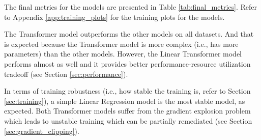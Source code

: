 \documentclass[a4paper, twoside]{report}
\theoremstyle{definition}
\numberwithin{equation}{section}
\begin{document}


The final metrics for the models are presented in Table \ref{tab:final_metrics}.
Refer to Appendix \ref{app:training_plots} for the training plots for the models.

The Transformer model outperforms the other models on all datasets. And that
is expected because the Transformer model is more complex (i.e., has more parameters)
than the other models. However, the Linear Transformer model performs almost as well
and it provides better performance-resource utilization tradeoff (see Section \ref{sec:performance}).

In terms of training robustness (i.e., how stable the training is, refer to Section \ref{sec:training}),
a simple Linear Regression model is the most stable model, as expected. Both Transformer models suffer
from the gradient explosion problem which leads to unstable training
which can be partially remediated (see Section \ref{sec:gradient_clipping}).
\end{document}
